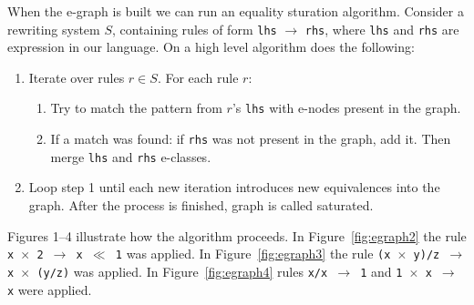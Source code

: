 When the e-graph is built we can run an equality sturation algorithm. Consider a rewriting system $S$, containing rules of form \texttt{lhs} $\longrightarrow$ \texttt{rhs}, where \texttt{lhs} and \texttt{rhs} are expression in our language. On a high level algorithm does the following: 
\begin{enumerate}
  \item Iterate over rules $r \in S$. For each rule $r$:
  \begin{enumerate}
    \item Try to match the pattern from $r$'s \texttt{lhs} with e-nodes present in the graph. 
    \item If a match was found: if \texttt{rhs} was not present in the graph, add it. Then merge \texttt{lhs} and \texttt{rhs} e-classes.
  \end{enumerate}  
  \item Loop step 1 until each new iteration introduces new equivalences into the graph. After the process is finished, graph is called saturated.
\end{enumerate}

Figures 1--4 illustrate how the algorithm proceeds. In Figure~\ref{fig:egraph2} the rule \texttt{x $\times$ 2 $\longrightarrow$ x $\ll$ 1} was applied. In Figure~\ref{fig:egraph3} the rule \texttt{(x $\times$ y)/z $\longrightarrow$ x $\times$ (y/z)} was applied. In Figure~\ref{fig:egraph4} rules \texttt{x/x $\longrightarrow$ 1} and \texttt{1 $\times$ x $\longrightarrow$ x} were applied.
